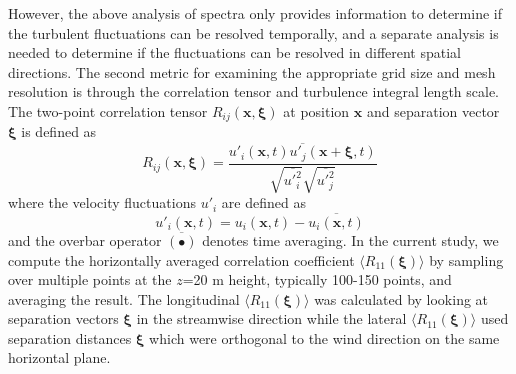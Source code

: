 However, the above analysis of spectra only provides information to
determine if the turbulent fluctuations can be resolved temporally,
and a separate analysis is needed to determine if the fluctuations can
be resolved in different spatial directions.  The second metric for
examining the appropriate grid size and mesh resolution is through the
correlation tensor and turbulence integral length scale.  The
two-point correlation tensor $R_{ij}(\mathbf{x},\boldsymbol{\xi})$ at
position $\mathbf{x}$ and separation vector $\boldsymbol{\xi}$ is
defined as
\begin{equation}
  \label{eq:Rij}
  R_{ij}({\mathbf x},\boldsymbol{\xi}) =
  \frac{\overline{ {u'_i(\mathbf{x}, t) u'_j(\mathbf{x}+\boldsymbol{\xi},t)} }}
       { \sqrt{\overline{ u'^2_i }} \sqrt{\overline{ u'^2_j}} }
\end{equation}
where the velocity fluctuations $u'_i$ are defined as
\begin{equation}
  u'_i(\mathbf{x},t) = u_i(\mathbf{x},t) - \overline{ u_i(\mathbf{x},t) }
\end{equation}
and the overbar operator $\overline{(\bullet)}$ denotes time
averaging.  In the current study, we compute the horizontally averaged
correlation coefficient $\langle R_{11}(\boldsymbol{\xi})\rangle$ by
sampling over multiple points at the $z$=20 m height, typically 100-150
points, and averaging the result.  The longitudinal $\langle
R_{11}(\boldsymbol{\xi})\rangle$ was calculated by looking at
separation vectors $\boldsymbol{\xi}$ in the streamwise direction
while the lateral $\langle R_{11}(\boldsymbol{\xi})\rangle$ used
separation distances $\boldsymbol{\xi}$ which were orthogonal to the
wind direction on the same horizontal plane.

